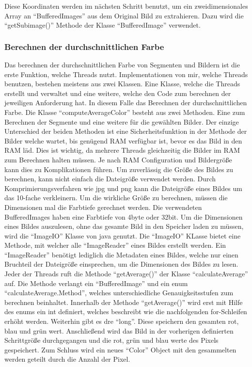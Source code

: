 Diese Koordinaten werden im nächsten Schritt benutzt, um ein zweidimensionales Array an ``BufferedImages'' aus dem Original Bild zu extrahieren. Dazu wird die ``getSubimage()'' Methode der Klasse ``BufferedImage'' verwendet.

\subsubsection{Berechnen der durchschnittlichen Farbe}
Das berechnen der durchschnittlichen Farbe von Segmenten und Bildern ist die erste Funktion, welche Threads nutzt. Implementationen von mir, welche Threads benutzen, bestehen meistens aus zwei Klassen. Eine Klasse, welche die Threads erstellt und verwaltet und eine weitere, welche den Code zum berechnen der jeweiligen Anforderung hat. In diesem Falle das Berechnen der durchschnittlichen Farbe. Die Klasse ``computeAverageColor'' besteht aus zwei Methoden. Eine zum Berechnen der Segmente und eine weitere für die gewählten Bilder. Der einzige Unterschied der beiden Methoden ist eine Sicherheitsfunktion in der Methode der Bilder welche wartet, bis genügend RAM verfügbar ist, bevor es das Bild in den RAM läd. Dies ist wichtig, da mehrere Threads gleichzeitig die Bilder im RAM zum Berechnen halten müssen. Je nach RAM Configuration und Bildergröße kann dies zu Komplikationen führen. Um zuverlässig die Größe des Bildes zu berechnen, kann nicht einfach die Dateigröße verwendet werden. Durch Komprimierungsverfahren wie jpg und png kann die Dateigröße eines Bildes um das 10-fache verkleinern. Um die wirkliche Größe zu berechnen, müssen die Dimensionen mal die Farbtiefe gerechnet werden. Die verwendeten BufferedImages haben eine Farbtiefe von 4byte oder 32bit. Um die Dimensionen eines Bildes auszulesen, ohne das gesamte Bild in den Speicher laden zu müssen, wird die ``ImageIO'' Klasse von java genutzt. Die ``ImageIO'' KLasse bietet eine Methode, mit welcher alle ``ImageReader'' eines Bildes erstellt werden. Ein ``ImageReader'' benötigt lediglich die Metadaten eines Bildes, welche nur einen Bruchteil der Dateigröße einsprechen, um die Dimensionen des Bildes zu lesen. Jeder der Threads ruft die Methode ``getAverage()'' der Klasse ``calculateAverage'' auf. Die Methode verlangt ein ``BufferedImage'' und ein enum ``calculateAverage.Method'', welches unterschiedliche Genauigkeitsstufen zum berechnen beinhaltet. Innerhalb der Methode ``getAverage()'' wird erst mit Hilfe des enums ein int definiert, welches beschreibt wie die nachfolgenden for-Schleifen erhöht werden. Weiterhin gibt es dre ``long''. Diese speichern den gesamten rot, blau und grün wert. Anschließend wird das Bild in der vorherigen definierten Schrittgröße durchgegangen und die rot, grün und blau werte des Pixels gespeichert. Zum Schluss wird ein neues ``Color'' Object mit den gesammelten werden geteilt durch die Anzahl der Pixel.


